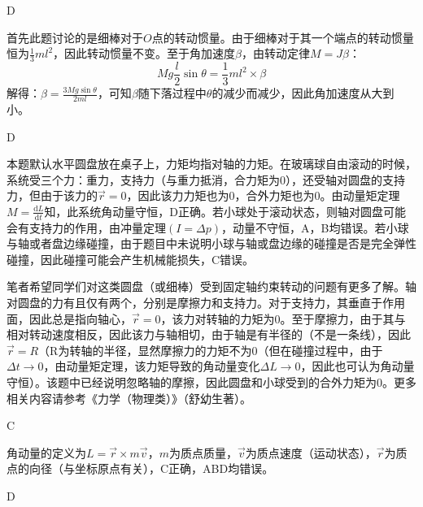 \documentclass[b5paper,opensource]{qyxf-book}
\newcommand{\di}[1]{\mathrm{d}#1}
\newcommand{\dy}[2]{\frac{\di{#1}}{\di{#2}}}
\begin{document}
D


首先此题讨论的是细棒对于$ O $点的转动惯量。由于细棒对于其一个端点的转动惯量恒为$ \frac{1}{3}ml^2 $，因此转动惯量不变。至于角加速度$ \beta $，由转动定律$M=J\beta$：
\[Mg\frac{l}{2}\sin\theta=\frac{1}{3}ml^2\times\beta\]
解得：$ \beta=\frac{3Mg\sin\theta}{2ml} $，可知$ \beta $随下落过程中$ \theta $的减少而减少，因此角加速度从大到小。
			
D

本题默认水平圆盘放在桌子上，力矩均指对轴的力矩。在玻璃球自由滚动的时候，系统受三个力：重力，支持力（与重力抵消，合力矩为0），还受轴对圆盘的支持力，但由于该力的$ \vec{r}=0 $，因此该力力矩也为0，合外力矩也为0。由动量矩定理$ M=\dy{L}{t} $知，此系统角动量守恒，D正确。若小球处于滚动状态，则轴对圆盘可能会有支持力的作用，由冲量定理$ (I=\Delta p) $，动量不守恒，A，B均错误。若小球与轴或者盘边缘碰撞，由于题目中未说明小球与轴或盘边缘的碰撞是否是完全弹性碰撞，因此碰撞可能会产生机械能损失，C错误。\\
\begin{note}
笔者希望同学们对这类圆盘（或细棒）受到固定轴约束转动的问题有更多了解。轴对圆盘的力有且仅有两个，分别是摩擦力和支持力。对于支持力，其垂直于作用面，因此总是指向轴心，$ \vec{r}=0 $，该力对转轴的力矩为0。至于摩擦力，由于其与相对转动速度相反，因此该力与轴相切，由于轴是有半径的（不是一条线），因此$ \vec{r}=R $（R为转轴的半径，显然摩擦力的力矩不为0（但在碰撞过程中，由于$ \Delta t\to 0 $，由动量矩定理，该力矩导致的角动量变化$ \Delta L\to 0 $，因此也可认为角动量守恒）。该题中已经说明忽略轴的摩擦，因此圆盘和小球受到的合外力矩为0。更多相关内容请参考《力学（物理类）》（舒幼生著）。
\end{note}
			
C
			
角动量的定义为$ L=\vec{r}\times m\vec{v} $，$ m $为质点质量，$ \vec{v} $为质点速度（运动状态），$ \vec{r} $为质点的向径（与坐标原点有关），C正确，ABD均错误。
			
D
		
\end{document}
